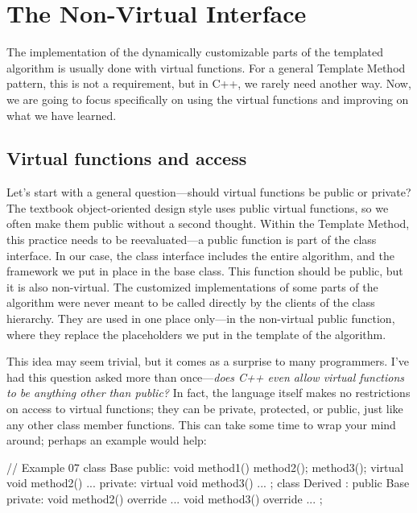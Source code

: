 \section{The Non-Virtual Interface}

The implementation of the dynamically customizable parts of the templated algorithm is usually done with virtual functions. For a general Template Method pattern, this is not a requirement, but in C++, we rarely need another way. Now, we are going to focus specifically on using the virtual functions and improving on what we have learned.

\subsection{Virtual functions and access}

Let's start with a general question---should virtual functions be public or private? The textbook object-oriented design style uses public virtual functions, so we often make them public without a second thought. Within the Template Method, this practice needs to be reevaluated---a public function is part of the class interface. In our case, the class interface includes the entire algorithm, and the framework we put in place in the base class. This function should be public, but it is also non-virtual. The customized implementations of some parts of the algorithm were never meant to be called directly by the clients of the class hierarchy. They are used in one place only---in the non-virtual public function, where they replace the placeholders we put in the template of the algorithm.

This idea may seem trivial, but it comes as a surprise to many programmers. I've had this question asked more than once---\emph{does C++ even allow virtual functions to be anything other than public?} In fact, the language itself makes no restrictions on access to virtual functions; they can be private, protected, or public, just like any other class member functions. This can take some time to wrap your mind around; perhaps an example would help:

\begin{code}
// Example 07
class Base {
  public:
  void method1() { method2(); method3(); }
  virtual void method2() { ... }
  private:
  virtual void method3() { ... }
};
class Derived : public Base {
  private:
  void method2() override { ... }
  void method3() override { ... }
};
\end{code}

